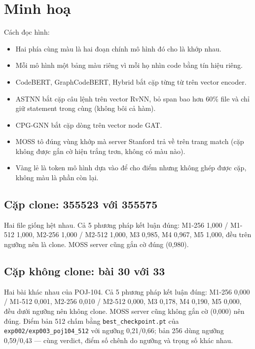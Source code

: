 \documentclass[11pt,a4paper]{article}
\begin{document}
\section{Minh hoạ}
Cách đọc hình:
\begin{itemize}[leftmargin=*,itemsep=0pt,topsep=2pt,parsep=0pt]
\item Hai phía cùng màu là hai đoạn chính mô hình đó cho là khớp nhau.
\item Mỗi mô hình một bảng màu riêng vì mỗi họ nhìn code bằng tín hiệu riêng.
\item CodeBERT, GraphCodeBERT, Hybrid bắt cặp từng từ trên vector encoder.
\item ASTNN bắt cặp câu lệnh trên vector RvNN, bỏ span bao hơn 60\% file
  và chỉ giữ statement trong cùng (không bôi cả hàm).
\item CPG-GNN bắt cặp dòng trên vector node GAT.
\item MOSS tô đúng vùng khớp mà server Stanford trả về trên trang match
(cặp không được gắn cờ hiện trắng trơn, không có màu nào).
\item \colorbox{evyellow!30}{Vàng} lẻ là token mô hình dựa vào để cho điểm
  nhưng không ghép được cặp, không màu là phần còn lại.
\end{itemize}

\subsection{Cặp clone: 355523 với 355575}
Hai file giống hệt nhau.
Cả 5 phương pháp kết luận đúng: M1-256 1,000 / M1-512 1,000,
M2-256 1,000 / M2-512 1,000,
M3 0,985, M4 0,967, M5 1,000, đều trên ngưỡng nên là clone.
MOSS server cũng gắn cờ đúng (0,980).
{
}

\subsection{Cặp không clone: bài 30 với 33}
Hai bài khác nhau của POJ-104.
Cả 5 phương pháp kết luận đúng: M1-256 0,000 / M1-512 0,001,
M2-256 0,010 / M2-512 0,000,
M3 0,178, M4 0,190, M5 0,000, đều dưới ngưỡng nên không clone.
MOSS server cũng không gắn cờ (0,000) nên đúng.
Điểm bản 512 chấm bằng \texttt{best\_checkpoint.pt} của
\texttt{exp002/exp003\_poj104\_512} với ngưỡng 0,21/0,66;
bản 256 dùng ngưỡng 0,59/0,43 — cùng verdict, điểm số chênh do ngưỡng
và trọng số khác nhau.
{
}
\end{document}
